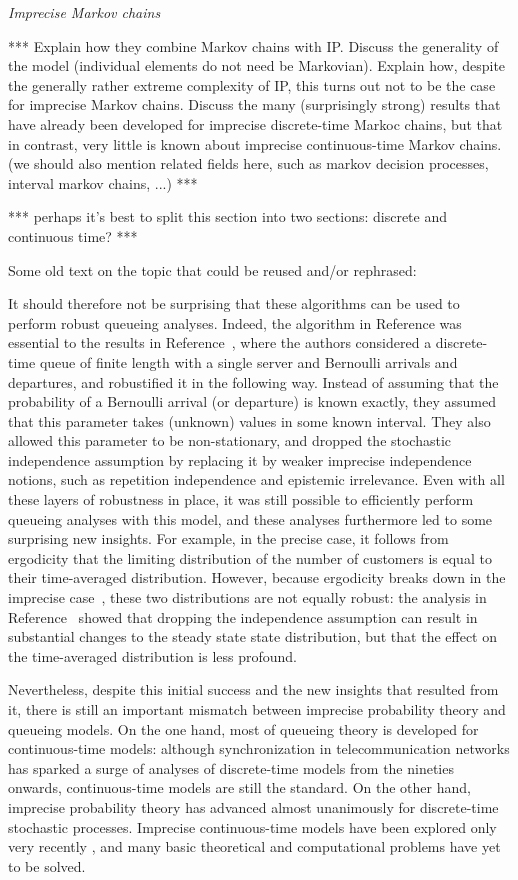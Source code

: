 \documentclass[11pt,dvipsnames,usenames,a4paper]{article}
\begin{document}
\emph{Imprecise Markov chains}

*** Explain how they combine Markov chains with IP. 
Discuss the generality of the model (individual elements do not need be Markovian).
Explain how, despite the generally rather extreme complexity of IP, this turns out not to be the case for imprecise Markov chains. Discuss the many (surprisingly strong) results that have already been developed for imprecise discrete-time Markoc chains, but that in contrast, very little is known about imprecise continuous-time Markov chains. (we should also mention related fields here, such as markov decision processes, interval markov chains, ...) ***

*** perhaps it's best to split this section into two sections: discrete and continuous time? ***


{\color{Gray}
Some old text on the topic that could be reused and/or rephrased:

It should therefore not be surprising that these algorithms can be used to perform robust queueing analyses. Indeed, the algorithm in Reference \cite{cooman2008} was essential to the results in Reference~\cite{2015Lopatatzidis}, where the authors considered a discrete-time queue of finite length with a single server and Bernoulli arrivals and departures, and robustified it in the following way.
Instead of assuming that the probability of a Bernoulli arrival (or departure) is known exactly, they assumed that this parameter takes (unknown) values in some known interval. They also allowed this parameter to be non-stationary, and dropped the stochastic independence assumption by replacing it by weaker imprecise independence notions, such as repetition independence and epistemic irrelevance.
Even with all these layers of robustness in place, it was still possible to efficiently perform queueing analyses with this model, and these analyses furthermore led to some surprising new insights. For example, in the precise case, it follows from ergodicity that the limiting distribution of the number of customers is equal to their time-averaged distribution. However, because ergodicity breaks down in the imprecise case~\cite{deCooman2015}, these two distributions are not equally robust: the analysis in Reference~\cite{2015Lopatatzidis} showed that dropping the independence assumption can result in substantial changes to the steady state state distribution, but that the effect on the time-averaged distribution is less profound.


Nevertheless, despite this initial success and the new insights that resulted from it, there is still an important mismatch between imprecise probability theory and queueing models.
On the one hand, most of queueing theory is developed for continuous-time models: although synchronization in telecommunication networks has sparked a surge of analyses of discrete-time models from the nineties onwards, continuous-time models are still the standard.
On the other hand, imprecise probability theory has advanced almost unanimously for discrete-time stochastic processes.
Imprecise continuous-time models have been explored only very recently \cite{Skulj2015,Troffaes+GSB-ISIPTA15p}, and many basic theoretical and computational problems have yet to be solved.
}
\end{document}
